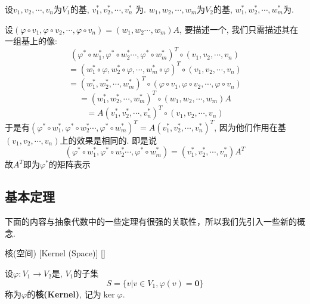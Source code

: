 \documentclass[UTF8]{ctexart}
\begin{document}
            \begin{prf}
                设$v_1,v_2,\cdots,v_n$为$V_1$的基, $v_1^*, v_2^*,\cdots,v_n^*$ 为. 
                $w_1,w_2,\cdots,w_m$为$V_2$的基, $w_1^*, w_2^*,\cdots, w_m^*$为. 
                
                设$(\varphi\circ v_1,\varphi\circ v_2,\cdots,\varphi\circ v_n)=(w_1,w_2\cdots,w_m)A$, 
                要描述一个, 我们只需描述其在一组基上的像:
                \[(\varphi^*\circ w_1^*,\varphi^*\circ w_2^*\cdots,\varphi^*\circ w_m^*)^T\circ(v_1,v_2,\cdots,v_n)\]
                \[=(w_1^*\circ\varphi,w_2^*\circ\varphi,\cdots,w_m^*\circ\varphi)^T\circ(v_1,v_2,\cdots,v_n)\]
                \[=(w_1^*,w_2^*,\cdots,w_m^*)^T\circ(\varphi\circ v_1,\varphi\circ v_2,\cdots,\varphi\circ v_n)\]
                \[=(w_1^*,w_2^*,\cdots,w_m^*)^T\circ(w_1,w_2,\cdots,w_m)A\]
                \[=A(v_1^*,v_2^*,\cdots,v_n^*)^T\circ(v_1,v_2,\cdots,v_n)\]
                于是有$(\varphi^*\circ w_1^*,\varphi^*\circ w_2^*\cdots,\varphi^*\circ w_m^*)^T=A(v_1^*,v_2^*,\cdots,v_n^*)^T$, 
                因为他们作用在基$(v_1,v_2,\cdots,v_n)$上的效果是相同的. 即是说
                \[(\varphi^*\circ w_1^*,\varphi^*\circ w_2^*\cdots,\varphi^*\circ w_m^*)=(v_1^*,v_2^*,\cdots,v_n^*)A^T\]
                故$A^T$即为$\varphi^*$的矩阵表示
            \end{prf}
            
        
		
	
	\subsection{ 基本定理}
	下面的内容与抽象代数中的一些定理有很强的关联性，所以我们先引入一些新的概念.
		\begin{dfn}
			[]
			{核(空间)}
			[Kernel (Space)]
			[]

			设$\varphi:V_1\to V_2$是, $V_1$的子集$$S=\{v|v\in V_1,\varphi(v)=\mathbf{0}\}$$称为$\varphi$的\textbf{核(Kernel)}, 记为$\ker\varphi$. 
		\end{dfn}
  
\end{document}
